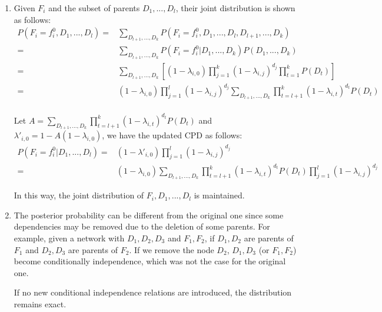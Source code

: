\documentclass[notitlepage]{article}
\begin{document}
\begin{enumerate}
\item 
Given $F_i$ and the subset of parents $D_1,...,D_l$, their joint distribution is shown as follows:
\begin{align*}
P(F_i=f_i^0, D_1,...,D_l) 
=& \sum_{D_{l+1},...,D_k}P(F_i=f_i^0, D_1,...,D_l, D_{l+1}, ..., D_k)\\
=& \sum_{D_{l+1},...,D_k}P(F_i=f_i^0 | D_1,...,D_k)P(D_1,...,D_k)\\
=& \sum_{D_{l+1},...,D_k}\left[(1-\lambda_{i,0})\prod_{j=1}^{k}(1-\lambda_{i,j})^{d_{j}}\prod_{t=1}^{k}P(D_t)\right]\\
=& (1-\lambda_{i,0})\prod_{j=1}^l(1-\lambda_{i,j})^{d_{j}}\sum_{D_{l+1},...,D_k}\prod_{t=l+1}^k(1-\lambda_{i,t})^{d_t}P(D_t)\\
\end{align*}

Let $A=\sum\limits_{D_{l+1},...,D_k}\prod\limits_{t=l+1}^k(1-\lambda_{i,t})^{d_t}P(D_t)$ and $\lambda'_{i,0}=1-A(1-\lambda_{i,0})$, we have the updated CPD as follows: 
\begin{align*}
P(F_i=f_i^0|D_1,...,D_l)
= &(1-\lambda'_{i,0})\prod_{j=1}^l (1-\lambda_{i,j})^{d_j}\\
= &(1-\lambda_{i,0})\sum\limits_{D_{l+1},...,D_k}\prod\limits_{t=l+1}^k(1-\lambda_{i,t})^{d_t}P(D_t)\prod_{j=1}^l (1-\lambda_{i,j})^{d_j}
\end{align*}

In this way, the joint distribution of $F_i,D_1,...,D_l$ is maintained.

\item The posterior probability can be different from the original one since some dependencies may be removed due to the deletion of some parents. For example, given a network with $D_1,D_2,D_3$ and $F_1,F_2$, if $D_1,D_2$ are parents of $F_1$ and $D_2,D_3$ are parents of $F_2$. If we remove the node $D_2$, $D_1,D_3$ (or $F_1, F_2$) become conditionally independence, which was not the case for the original one.

If no new conditional independence relations are introduced, the distribution remains exact.
\end{enumerate}
\end{document}
